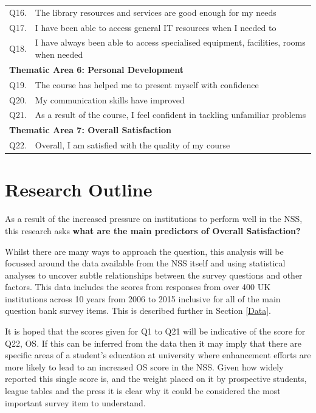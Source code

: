 \documentclass[11pt,a4paper]{report}
\begin{document}
\begin{table}[p]
\begin{tabular}{ll}
	Q16. &The library resources and services are good enough for my needs \\[0.1cm]
	Q17. &I have been able to access general IT resources when I needed to \\[0.1cm]
	Q18. &I have always been able to access specialised equipment, facilities, rooms when needed\\[0.3cm] 

	\multicolumn{2}{l}{\textbf{Thematic Area 6: Personal Development}} \\[0.1cm]

	Q19. &The course has helped me to present myself with confidence \\[0.1cm]
	Q20. &My communication skills have improved \\[0.1cm]
	Q21. &As a result of the course, I feel confident in tackling unfamiliar problems\\[0.3cm] 

	\multicolumn{2}{l}{\textbf{Thematic Area 7: Overall Satisfaction}} \\[0.1cm]

	Q22. &Overall, I am satisfied with the quality of my course \\[0.1cm]
	\hline \hline
	\end{tabular}
\label{table:NSSquestions}
\end{table}


\section{Research Outline} \label{Research Q}

As a result of the increased pressure on institutions to perform well in the NSS, this research asks \textbf{what are the main predictors of Overall Satisfaction?}

Whilst there are many ways to approach the question, this analysis will be focussed around the data available from the NSS itself and using statistical analyses to uncover subtle relationships between the survey questions and other factors. This data includes the scores from responses from over 400 UK institutions across 10 years from 2006 to 2015 inclusive for all of the main question bank survey items. This is described further in Section \ref{Data}. 

 It is hoped that the scores given for Q1 to Q21 will be indicative of the score for Q22, \ac{OS}. If this can be inferred from the data then it may imply that there are specific areas of a student's education at university where enhancement efforts are more likely to lead to an increased \ac{OS} score in the NSS. Given how widely reported this single score is, and the weight placed on it by prospective students, league tables and the press it is clear why it could be considered the most important survey item to understand.  
 
\end{document}

